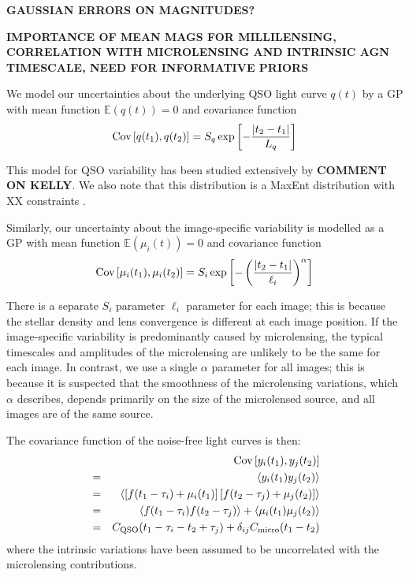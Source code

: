 \documentclass[useAMS,usenatbib, a4paper]{mn2e} \usepackage{natbib}
\begin{document}
{\bf GAUSSIAN ERRORS ON MAGNITUDES?}

{\bf IMPORTANCE OF MEAN MAGS FOR MILLILENSING, CORRELATION WITH MICROLENSING AND INTRINSIC AGN TIMESCALE, NEED FOR INFORMATIVE PRIORS}

We model our uncertainties about the underlying QSO light curve $q(t)$ by
a GP with mean function $\mathds{E}\left(q(t)\right) = 0$ and covariance function
\begin{eqnarray}
\textnormal{Cov}\left[q(t_1), q(t_2)\right] = S_q\exp
\left[-\frac{|t_2 - t_1|}{L_q}\right]
\end{eqnarray}

This model for QSO variability has been studied extensively by \citep{}
{\bf COMMENT ON KELLY}. We also note that this distribution is a MaxEnt
distribution \citep{} with XX constraints \citep{sivia}.

Similarly, our uncertainty about the image-specific variability is modelled
as a GP with mean function $\mathds{E}\left(\mu_i(t)\right) = 0$ and
covariance function
\begin{eqnarray}
\textnormal{Cov}\left[\mu_i(t_1), \mu_i(t_2)\right] =
S_i\exp\left[
-\left(\frac{|t_2 - t_1|
}{\ell_i}\right)^\alpha
\right]
\end{eqnarray}

There is a separate $S_i$ parameter $\ell_i$ parameter
for each image; this is because the stellar density and lens convergence is
different at each image position. If the image-specific variability is
predominantly caused by microlensing, the typical timescales and amplitudes
of the microlensing are unlikely to be the same for each image.
In contrast, we use a single $\alpha$ parameter for all images;
this is because it is suspected that the
smoothness of the microlensing variations, which $\alpha$ describes, depends
primarily on the size of the microlensed source, and all images are of the
same source. 

The covariance function of the noise-free light curves is then:
\begin{eqnarray}
& & \textnormal{Cov}\left[y_i(t_1), y_j(t_2)\right] \nonumber\\
&=& \left<y_i(t_1)y_j(t_2)\right> \\
&=& \left<\left[f(t_1 - \tau_i) + \mu_i(t_1)\right]\left[f(t_2 - \tau_j) + \mu_j(t_2)\right]\right> \\
&=& \left<f(t_1 - \tau_i)f(t_2 - \tau_j)\right> + \left<\mu_i(t_1)\mu_j(t_2)\right> \\
&=& C_{\rm QSO}(t_1 - \tau_i - t_2 + \tau_j) + \delta_{ij}C_{\rm micro}(t_1 - t_2)
\end{eqnarray}
where the intrinsic variations have been assumed to be uncorrelated with the
microlensing contributions.
\end{document}
